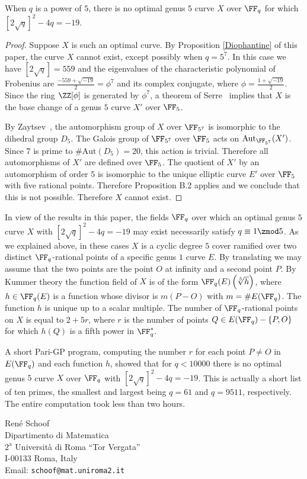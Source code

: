 \begin{corollary}
When $q$ is a power of $5$, there is no optimal genus $5$ curve $X$ over
$\FF_q$ for which $[2\sqrt{q}]^2 - 4q = -19.$
\end{corollary}

\begin{proof}
Suppose $X$ is such an optimal curve. By Proposition \ref{Diophantine} of this paper, the
curve $X$ cannot exist, except possibly when $q=5^7$. In this case we have $[2\sqrt{q}] = 559$ and the eigenvalues of the characteristic polynomial of Frobenius are $\frac{-559+\sqrt{-19}}{2} = \phi^7$ and its complex conjugate, where $\phi = \frac{1+\sqrt{-19}}{2}$. Since the ring $\ZZ[\phi]$ is generated by $\phi^7$, a theorem of Serre~\cite[Thm.~9 of the appendix]{Lauter} implies that $X$ is the base change
of a genus $5$ curve $X'$ over $\FF_5$.

By Zaytsev~\cite[Thm.~4.13]{zaytsevoptimal}, the automorphism group of $X$ over
$\FF_{5^7}$ is isomorphic to the dihedral group $D_5$. The Galois group of
$\FF_{5^7}$ over $\FF_5$ acts on $\mathrm{Aut}_{\FF_{5^7}}(X')$. Since $7$ is
prime to $\#\mathrm{Aut}(D_5)=20$, this action is trivial. Therefore all
automorphisms of $X'$ are defined over $\FF_5$. The quotient of $X'$ by an
automorphism of order $5$ is isomorphic to the unique elliptic curve $E'$ over
$\FF_5$ with five rational points. Therefore Proposition B.2 applies and we
conclude that this is not possible. Therefore $X$ cannot exist.
\end{proof}

In view of the results in this paper, the fields $\FF_q$ over which an optimal
genus $5$ curve $X$ with $[2\sqrt{q}]^2 - 4q = -19$ may exist necessarily satisfy $q \equiv 1 \zmod 5$. As we explained above, in these cases $X$ is a cyclic degree $5$ cover ramified
over two distinct $\FF_q$-rational points of a specific genus $1$ curve $E$. By
translating we may assume that the two points are the point $O$ at infinity and
a second point $P$. By Kummer theory the function field of $X$ is of the form $\FF_q(E)\left(\sqrt[5]{h}\right)$, where $h \in \FF_q(E)$ is a function whose divisor is $m(P-O)$ with
$m=\#E(\FF_q)$. The function $h$ is unique up to a scalar multiple. The number
of $\FF_q$-rational points on $X$ is equal to $2+5r$, where $r$ is the number
of points $Q \in E(\FF_q) - \{P,O\}$ for which $h(Q)$ is a fifth power in $\FF_q^*$.

A short Pari-GP program, computing the number $r$ for each point $P \neq O$ in
$E(\FF_q)$ and each function $h$, showed that for $q<10000$ there is no optimal
genus $5$ curve $X$ over $\FF_q$ with $[2\sqrt{q}]^2 - 4q = -19$. This is actually a short list of ten primes, the smallest and largest being
$q=61$ and $q=9511$, respectively. The entire computation took less than two
hours.

 

 

\vspace{1em}

\noindent
Ren\'e Schoof\\[0.5em]
Dipartimento di Matematica\\
$2^{\mathrm{a}}$ Universit\`a di Roma ``Tor Vergata''\\
I-00133 Roma, Italy\\
Email: \texttt{schoof@mat.uniroma2.it}

%
